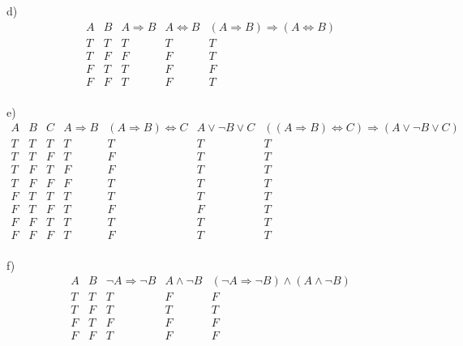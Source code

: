 \documentclass{article}
\begin{document}
d)\\
\begin{displaymath}
\begin{array}{|c|c|c|c|c|c}

A & 
B & 
A \Rightarrow B & 
A \Leftrightarrow B & 
(A \Rightarrow B) \Rightarrow (A \Leftrightarrow B)\\ %
\hline  %
T & T & T & T & T\\
T & F & F & F & T\\
F & T & T & F & F\\
F & F & T & F & T\\

\end{array}
\end{displaymath}

e)\\
\begin{displaymath}
\begin{array}{|c|c|c|c|c|c|c|c}

A & 
B & 
C &
A \Rightarrow B & 
(A \Rightarrow B) \Leftrightarrow C &
A \vee \neg B \vee C &
((A \Rightarrow B) \Leftrightarrow C) \Rightarrow (A \vee \neg B \vee C)\\ %
\hline  %
T & T & T & T & T & T & T\\
T & T & F & T & F & T & T\\
T & F & T & F & F & T & T\\
T & F & F & F & T & T & T\\
F & T & T & T & T & T & T\\
F & T & F & T & F & F & T\\
F & F & T & T & T & T & T\\
F & F & F & T & F & T & T\\

\end{array}
\end{displaymath}

f)\\
\begin{displaymath}
\begin{array}{|c|c|c|c|c|c}

A & 
B & 
\neg A \Rightarrow \neg B & 
A \wedge \neg B &
(\neg A \Rightarrow \neg B) \wedge (A \wedge \neg B)\\ %
\hline  %
T & T & T & F & F\\
T & F & T & T & T\\
F & T & F & F & F\\
F & F & T & F & F\\

\end{array}
\end{displaymath}
\end{document}
